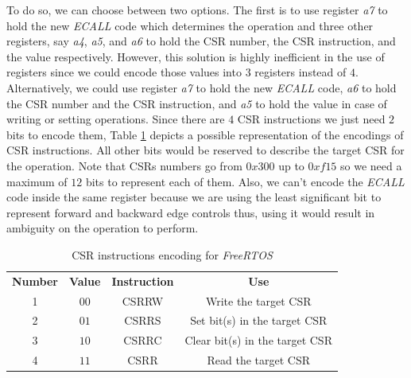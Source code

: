 To do so, we can choose between two options. The first is to use register
\textit{a7} to hold the new \textit{ECALL} code which determines the operation
and three other registers, say \textit{a4}, \textit{a5}, and \textit{a6} to hold
the CSR number, the CSR instruction, and the value respectively. However, this
solution is highly inefficient in the use of registers since we could encode
those values into $3$ registers instead of $4$. Alternatively, we could use
register \textit{a7} to hold the new \textit{ECALL} code, \textit{a6} to hold
the CSR number and the CSR instruction, and \textit{a5} to hold the value in
case of writing or setting operations. Since there are $4$ CSR instructions we just
need $2$ bits to encode them, Table \ref{tab:instructionenc} depicts a possible
representation of the encodings of CSR instructions. All other bits would be reserved
to describe the target CSR for the operation. Note that CSRs numbers go from
$0x300$ up to $0xf15$ so we need a maximum of $12$ bits to represent each of
them. Also, we can't encode the \textit{ECALL} code inside the same register because
we are using the least significant bit to represent forward and backward edge controls
thus, using it would result in ambiguity on the operation to perform.

\begin{table}
  \centering
  \begin{tabular}{|c|c|c|c|}
    \hline
    \textbf{Number} & \textbf{Value} & \textbf{Instruction} & \textbf{Use}                   \\
    \hhline{====} 1 & $00$           & CSRRW                & Write the target CSR           \\
    \hline
    2               & $01$           & CSRRS                & Set bit(s) in the target CSR   \\
    \hline
    3               & $10$           & CSRRC                & Clear bit(s) in the target CSR \\
    \hline
    4               & $11$           & CSRR                 & Read the target CSR            \\
    \hline
  \end{tabular}
  \caption{CSR instructions encoding for \textit{FreeRTOS}}
  \label{tab:instructionenc}
\end{table}

